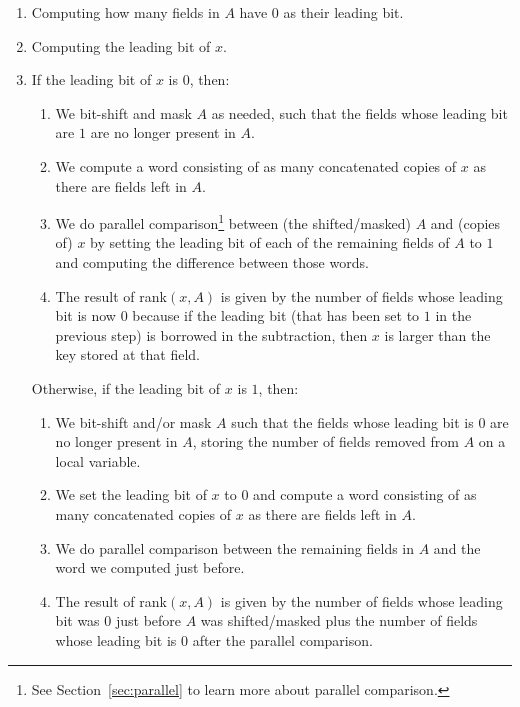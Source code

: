 \begin{enumerate}
    \item
    Computing how many fields in $A$ have $0$ as their leading bit.
    
    \item
    Computing the leading bit of $x$.
    
    \item
    If the leading bit of $x$ is $0$, then:
    \begin{enumerate}
        \item
        We bit-shift and mask $A$ as needed, such that the fields whose leading bit are $1$ are no longer present in $A$.
        
        \item
        We compute a word consisting of as many concatenated copies of $x$ as there are fields left in $A$.
        
        \item
        We do parallel comparison\footnote{See Section~\ref{sec:parallel} to learn more about parallel comparison.} between (the shifted/masked) $A$ and (copies of) $x$ by setting the leading bit of each of the remaining fields of $A$ to $1$ and computing the difference between those words.
        
        \item
        The result of rank$(x,A)$ is given by the number of fields whose leading bit is now $0$ because if the leading bit (that has been set to $1$ in the previous step) is borrowed in the subtraction, then $x$ is larger than the key stored at that field.
    \end{enumerate}
    
    Otherwise, if the leading bit of $x$ is $1$, then:
    \begin{enumerate}
        \item
        We bit-shift and/or mask $A$ such that the fields whose leading bit is $0$ are no longer present in $A$, storing the number of fields removed from $A$ on a local variable.
        
        \item
		We set the leading bit of $x$ to $0$ and compute a word consisting of as many concatenated copies of $x$ as there are fields left in $A$.
		
		\item
        We do parallel comparison between the remaining fields in $A$ and the word we computed just before.
        
        \item
        The result of rank$(x,A)$ is given by the number of fields whose leading bit was $0$ just before $A$ was shifted/masked plus the number of fields whose leading bit is $0$ after the parallel comparison.
    \end{enumerate}
    
\end{enumerate}

